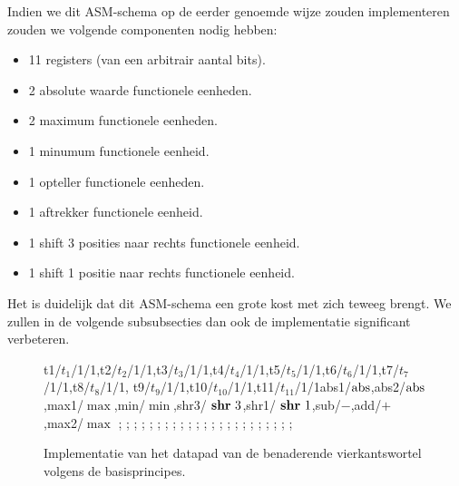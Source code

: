 Indien we dit ASM-schema op de eerder genoemde wijze zouden implementeren zouden we volgende componenten nodig hebben:
\begin{itemize}
 \item 11 registers (van een arbitrair aantal bits).
 \item 2 absolute waarde functionele eenheden.
 \item 2 maximum functionele eenheden.
 \item 1 minumum functionele eenheid.
 \item 1 opteller functionele eenheden.
 \item 1 aftrekker functionele eenheid.
 \item 1 shift 3 posities naar rechts functionele eenheid.
 \item 1 shift 1 positie naar rechts functionele eenheid.
\end{itemize}
Het is duidelijk dat dit ASM-schema een grote kost met zich teweeg brengt. We zullen in de volgende subsubsecties dan ook de implementatie significant verbeteren.
\begin{figure}[hbt]
\centering
\begin{sprocessor}[0.75/1.25/1.3/1.4/0.25/0.8]{t1/$t_1$/1/1,t2/$t_2$/1/1,t3/$t_3$/1/1,t4/$t_4$/1/1,t5/$t_5$/1/1,t6/$t_6$/1/1,t7/$t_7$/1/1,t8/$t_8$/1/1, t9/$t_9$/1/1,t10/$t_{10}$/1/1,t11/$t_{11}$/1/1}{abs1/$\operatorname{abs}$,abs2/$\operatorname{abs}$,max1/$\max$,min/$\min$,shr3/$\mbox{ \textbf{shr} }3$,shr1/$\mbox{ \textbf{shr} }1$,sub/$-$,add/$+$,max2/$\max$}{}
;
;
;
;
;
;
;
;
;
;
;
;
;
;
;
;
;
;
;
;
;
;
;
\end{sprocessor}
\caption{Implementatie van het datapad van de benaderende vierkantswortel volgens de basisprincipes.}
\end{figure}
